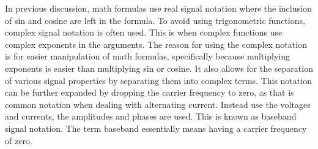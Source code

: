 \documentclass[12pt]{article}
\begin{document}
In previous discussion, math formulas use real signal notation where the inclusion of sin and cosine are left in the formula. To avoid using trigonometric functions, complex signal notation is often used. This is when complex functions use complex exponents in the arguments. The reason for using the complex notation is for easier manipulation of math formulas, specifically because multiplying exponents is easier than multiplying sin or cosine. It also allows for the separation of various signal properties by separating them into complex terms. This notation can be further expanded by dropping the carrier frequency to zero, as that is common notation when dealing with alternating current. Instead use the voltages and currents, the amplitudes and phases are used. This is known as baseband signal notation. The term baseband essentially means having a carrier frequency of zero. 

\end{document}

